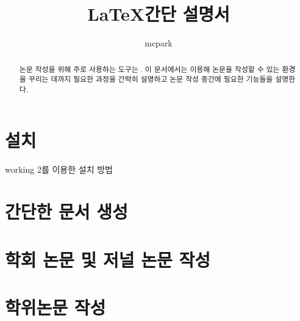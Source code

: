 \documentclass[a4paper, nobookmarks, subfigure, adjustmath, amsmath]{oblivoir}
\title{\LaTeX 간단 설명서}
\author{mcpark}
\begin{document}
\maketitle
\begin{abstract}
논문 작성을 위해 주로 사용하는 도구는 .
이 문서에서는  이용해 논문을 작성할 수 있는 환경을 꾸리는 데까지 필요한 과정을 간략히 설명하고 논문 작성 중간에 필요한  기능들을 설명한다.
\end{abstract}

\section{설치}
working 2를 이용한 설치 방법


\section{간단한 문서 생성}


\section{학회 논문 및 저널 논문 작성}


\section{학위논문 작성}
\end{document}
